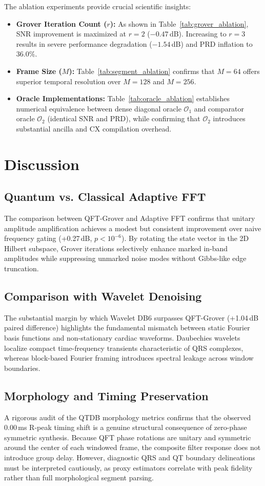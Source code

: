 \documentclass[journal,compsoc]{IEEEtran}
\begin{document}
The ablation experiments provide crucial scientific insights:
\begin{itemize}
    \item \textbf{Grover Iteration Count ($r$):} As shown in Table~\ref{tab:grover_ablation}, SNR improvement is maximized at $r=2$ ($-0.47$\,dB). Increasing to $r=3$ results in severe performance degradation ($-1.54$\,dB) and PRD inflation to $36.0\%$.
    \item \textbf{Frame Size ($M$):} Table~\ref{tab:segment_ablation} confirms that $M=64$ offers superior temporal resolution over $M=128$ and $M=256$.
    \item \textbf{Oracle Implementations:} Table~\ref{tab:oracle_ablation} establishes numerical equivalence between dense diagonal oracle $\mathcal{O}_1$ and comparator oracle $\mathcal{O}_2$ (identical SNR and PRD), while confirming that $\mathcal{O}_2$ introduces substantial ancilla and CX compilation overhead.
\end{itemize}

\section{Discussion}
\label{sec:discussion}
\subsection{Quantum vs. Classical Adaptive FFT}
The comparison between QFT-Grover and Adaptive FFT confirms that unitary amplitude amplification achieves a modest but consistent improvement over naive frequency gating (+0.27\,dB, $p < 10^{-6}$). By rotating the state vector in the 2D Hilbert subspace, Grover iterations selectively enhance marked in-band amplitudes while suppressing unmarked noise modes without Gibbs-like edge truncation.

\subsection{Comparison with Wavelet Denoising}
The substantial margin by which Wavelet DB6 surpasses QFT-Grover (+1.04\,dB paired difference) highlights the fundamental mismatch between static Fourier basis functions and non-stationary cardiac waveforms. Daubechies wavelets localize compact time-frequency transients characteristic of QRS complexes, whereas block-based Fourier framing introduces spectral leakage across window boundaries.

\subsection{Morphology and Timing Preservation}
A rigorous audit of the QTDB morphology metrics confirms that the observed $0.00$\,ms R-peak timing shift is a genuine structural consequence of zero-phase symmetric synthesis. Because QFT phase rotations are unitary and symmetric around the center of each windowed frame, the composite filter response does not introduce group delay. However, diagnostic QRS and QT boundary delineations must be interpreted cautiously, as proxy estimators correlate with peak fidelity rather than full morphological segment parsing.
\end{document}
